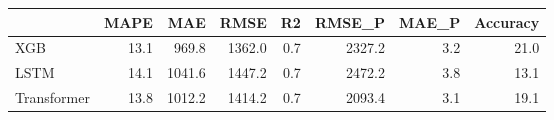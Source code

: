 \begin{tabular}{lrrrrrrr}
\toprule
{} &  MAPE &    MAE &   RMSE &  R2 &  RMSE\_P &  MAE\_P &  Accuracy \\
\midrule
XGB         &  13.1 &  969.8 & 1362.0 & 0.7 &  2327.2 &    3.2 &      21.0 \\
LSTM        &  14.1 & 1041.6 & 1447.2 & 0.7 &  2472.2 &    3.8 &      13.1 \\
Transformer &  13.8 & 1012.2 & 1414.2 & 0.7 &  2093.4 &    3.1 &      19.1 \\
\bottomrule
\end{tabular}

